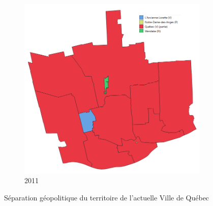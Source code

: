 \begin{figure}[ht]
\begin{subfigure}[t]{0.45\textwidth}
    \includegraphics[width=0.8 \linewidth]{images/municipalites_2011.png}
    \caption{2011}
    \label{fig:municipalites_2011}
  \end{subfigure}%
  \caption{Séparation géopolitique du territoire de l'actuelle Ville de Québec \parencite{elections_quebec_atlas_2021}}\label{fig:municipalites_carto_historique}
\end{figure}


